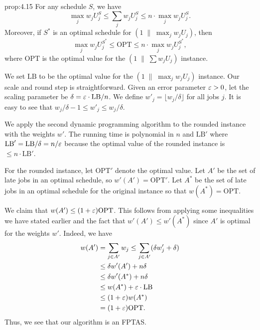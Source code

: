 \begin{prop}{prop:4.15}
    For any schedule $S$, we have 
    \[ \max_j w_j U_j^S \leq \sum_j w_j U_j^S \leq n \cdot \max_j w_j U_j^S. \] 
    Moreover, if $S^*$ is an optimal schedule for $(1\;\|\;\max_j w_jU_j)$, then 
    \[ \max_j w_j U_j^{S^*} \leq \text{OPT} \leq n \cdot \max_j w_j U_j^{S^*}, \] 
    where $\text{OPT}$ is the optimal value for the $(1\;\|\;\sum w_j U_j)$ instance. 
\end{prop}

We set $\text{LB}$ to be the optimal value for the $(1\;\|\;\max_j w_j U_j)$ 
instance. Our scale and round step is straightforward. Given an error 
parameter $\varepsilon > 0$, let the scaling parameter be $\delta = \varepsilon \cdot 
\text{LB}/n$. We define $w'_j = \lfloor w_j/\delta \rfloor$ for all jobs $j$. 
It is easy to see that $w_j/\delta - 1 \leq w'_j \leq w_j/\delta$. 

We apply the second dynamic programming algorithm to the rounded instance 
with the weights $w'$. The running time is polynomial in $n$ and 
$\text{LB}'$ where $\text{LB}' = \text{LB}/\delta = n/\varepsilon$ because 
the optimal value of the rounded instance is $\leq n \cdot \text{LB}'$.

For the rounded instance, let $\text{OPT}'$ denote the optimal value. 
Let $A'$ be the set of late jobs in an optimal schedule, so $w'(A') = 
\text{OPT}'$. Let $A^*$ be the set of late jobs in an optimal schedule for 
the original instance so that $w(A^*) = \text{OPT}$. 

We claim that $w(A') \leq (1+\varepsilon) \text{OPT}$. This follows from applying some
inequalities we have stated earlier and the fact that $w'(A') \leq w'(A^*)$ 
since $A'$ is optimal for the weights $w'$. Indeed, we have 
\begin{align*} 
    w(A') &= \sum_{j\in A'} w_j \leq \sum_{j\in A'} (\delta w'_j + \delta) \\
    &\leq \delta w'(A') + n\delta \\ 
    &\leq \delta w'(A^*) + n\delta \\
    &\leq w(A^*) + \varepsilon \cdot \text{LB} \\ 
    &\leq (1 + \varepsilon) w(A^*) \\ 
    &= (1 + \varepsilon) \text{OPT}. 
\end{align*}
Thus, we see that our algorithm is an FPTAS. 
